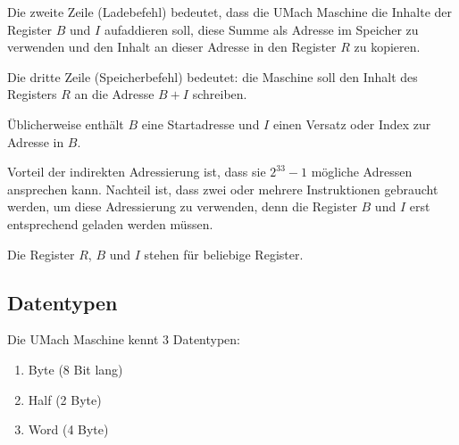 Die zweite Zeile (Ladebefehl) bedeutet, dass die UMach Maschine die Inhalte der
Register $B$ und $I$ aufaddieren soll, diese Summe als Adresse im
Speicher zu verwenden und den Inhalt an dieser Adresse in den Register $R$ zu
kopieren.

Die dritte Zeile (Speicherbefehl) bedeutet: die Maschine soll den Inhalt des
Registers $R$ an die Adresse $B + I$ schreiben.

Üblicherweise enthält $B$ eine Startadresse und $I$ einen Versatz oder Index zur
Adresse in $B$.

Vorteil der indirekten Adressierung ist, dass sie $2^{33} - 1$ mögliche Adressen
ansprechen kann. Nachteil ist, dass zwei oder mehrere Instruktionen gebraucht
werden, um diese Adressierung zu verwenden, denn die Register $B$ und $I$ erst
entsprechend geladen werden müssen.

Die Register $R$, $B$ und $I$ stehen für beliebige Register.

\subsection{Datentypen}
\label{subsec:Datentypen}

Die UMach Maschine kennt 3 Datentypen:
\begin{enumerate}
  \item Byte (8 Bit lang) 
  \item Half (2 Byte)
  \item Word (4 Byte)
\end{enumerate}



